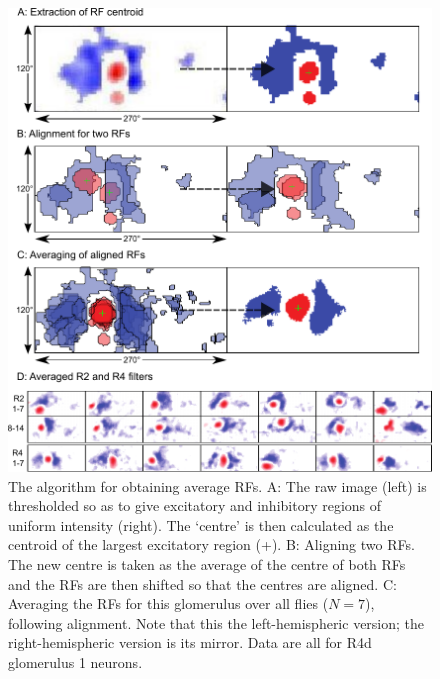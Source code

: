 \begin{figure}
\centering
\includegraphics{figures/avkernels}
\caption{The algorithm for obtaining average RFs.
A: The raw image (left) is thresholded so as to give excitatory and inhibitory regions of uniform intensity (right).
The `centre' is then calculated as the centroid of the largest excitatory region (+).
B: Aligning two RFs.
The new centre is taken as the average of the centre of both RFs and the RFs are then shifted so that the centres are aligned.
C: Averaging the RFs for this glomerulus over all flies ($N=7$), following alignment.
Note that this the left-hemispheric version; the right-hemispheric version is its mirror.
Data are all for R4d glomerulus 1 neurons.}
\label{fig:avkernels}
\end{figure}
